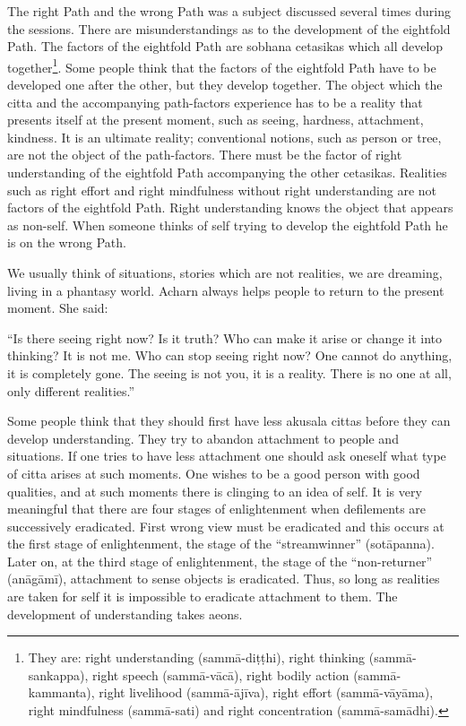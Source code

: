 The right Path and the wrong Path was a subject discussed several times
during the sessions. There are misunderstandings as to the development
of the eightfold Path. The factors of the eightfold Path are sobhana
cetasikas which all develop together\footnote{They are: right understanding (sammā-diṭṭhi), right thinking (sammā-sankappa), right
speech (sammā-vācā), right bodily action (sammā-kammanta), right
livelihood (sammā-ājīva), right effort (sammā-vāyāma), right mindfulness
(sammā-sati) and right concentration (sammā-samādhi).}. Some people think that
the factors of the eightfold Path have to be developed one after the
other, but they develop together. The object which the citta and the
accompanying path-factors experience has to be a reality that presents
itself at the present moment, such as seeing, hardness, attachment,
kindness. It is an ultimate reality; conventional notions, such as
person or tree, are not the object of the path-factors. There must be
the factor of right understanding of the eightfold Path accompanying the
other cetasikas. Realities such as right effort and right mindfulness
without right understanding are not factors of the eightfold Path. Right
understanding knows the object that appears as non-self. When someone
thinks of self trying to develop the eightfold Path he is on the wrong
Path.

We usually think of situations, stories which are not realities, we are
dreaming, living in a phantasy world. Acharn always helps people to
return to the present moment. She said:

``Is there seeing right now? Is it truth? Who can make it arise or
change it into thinking? It is not me. Who can stop seeing right now?
One cannot do anything, it is completely gone. The seeing is not you, it
is a reality. There is no one at all, only different realities.''

Some people think that they should first have less akusala cittas before
they can develop understanding. They try to abandon attachment to people
and situations. If one tries to have less attachment one should ask
oneself what type of citta arises at such moments. One wishes to be a
good person with good qualities, and at such moments there is clinging
to an idea of self. It is very meaningful that there are four stages of
enlightenment when defilements are successively eradicated. First wrong
view must be eradicated and this occurs at the first stage of
enlightenment, the stage of the ``streamwinner'' (sotāpanna). Later on,
at the third stage of enlightenment, the stage of the ``non-returner''
(anāgāmī), attachment to sense objects is eradicated. Thus, so long as
realities are taken for self it is impossible to eradicate attachment to
them. The development of understanding takes aeons.

